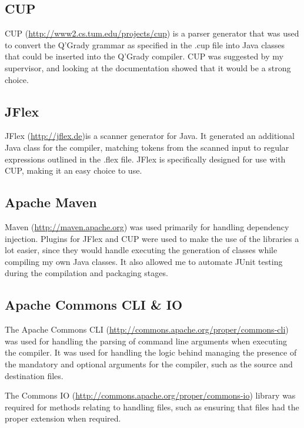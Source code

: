\documentclass[report.tex]{subfiles}
\begin{document}
\subsection{CUP} %
\label{sub:cup}
CUP (\url{http://www2.cs.tum.edu/projects/cup}) is a parser generator that was
used to convert the Q'Grady grammar as specified in the .cup file into Java
classes that could be inserted into the Q'Grady compiler. CUP was suggested by
my supervisor, and looking at the documentation showed that it would be a
strong choice.

\subsection{JFlex} %
\label{sub:jflex}
JFlex (\url{http://jflex.de})is a scanner generator for Java. It generated an
additional Java class for the compiler, matching tokens from the scanned input
to regular expressions outlined in the .flex file. JFlex is specifically
designed for use with CUP, making it an easy choice to use.

\subsection{Apache Maven} %
\label{sub:apache_maven}
Maven (\url{http://maven.apache.org}) was used primarily for handling dependency
injection. Plugins for JFlex and CUP were used to make the use of the libraries
a lot easier, since they would handle executing the generation of classes while
compiling my own Java classes. It also allowed me to automate JUnit testing
during the compilation and packaging stages.

\subsection{Apache Commons CLI \& IO} %
\label{sub:apache_commons_cli}
The Apache Commons CLI (\url{http://commons.apache.org/proper/commons-cli}) was
used for handling the parsing of command line arguments when executing the
compiler. It was used for handling the logic behind managing the presence of
the mandatory and optional arguments for the compiler, such as the source and
destination files.

The Commons IO (\url{http://commons.apache.org/proper/commons-io}) library was
required for methods relating to handling files, such as ensuring that files
had the proper extension when required.
\end{document}
